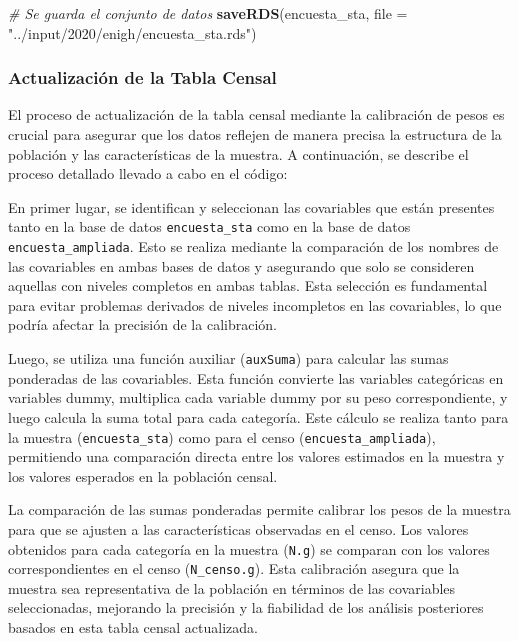 \documentclass[
  12pt,
]{book}
\newenvironment{Shaded}{\begin{snugshade}}{\end{snugshade}}
\newcommand{\AttributeTok}[1]{\textcolor[rgb]{0.13,0.29,0.53}{#1}}
\newcommand{\CommentTok}[1]{\textcolor[rgb]{0.56,0.35,0.01}{\textit{#1}}}
\newcommand{\FunctionTok}[1]{\textcolor[rgb]{0.13,0.29,0.53}{\textbf{#1}}}
\newcommand{\NormalTok}[1]{#1}
\newcommand{\StringTok}[1]{\textcolor[rgb]{0.31,0.60,0.02}{#1}}
\begin{document}
\begin{Shaded}
\begin{Highlighting}[]
\CommentTok{\# Se guarda el conjunto de datos}
\FunctionTok{saveRDS}\NormalTok{(encuesta\_sta, }\AttributeTok{file =} \StringTok{"../input/2020/enigh/encuesta\_sta.rds"}\NormalTok{)}
\end{Highlighting}
\end{Shaded}

\hypertarget{actualizaciuxf3n-de-la-tabla-censal}{%
\subsubsection*{Actualización de la Tabla Censal}\label{actualizaciuxf3n-de-la-tabla-censal}}

El proceso de actualización de la tabla censal mediante la calibración de pesos es crucial para asegurar que los datos reflejen de manera precisa la estructura de la población y las características de la muestra. A continuación, se describe el proceso detallado llevado a cabo en el código:

En primer lugar, se identifican y seleccionan las covariables que están presentes tanto en la base de datos \texttt{encuesta\_sta} como en la base de datos \texttt{encuesta\_ampliada}. Esto se realiza mediante la comparación de los nombres de las covariables en ambas bases de datos y asegurando que solo se consideren aquellas con niveles completos en ambas tablas. Esta selección es fundamental para evitar problemas derivados de niveles incompletos en las covariables, lo que podría afectar la precisión de la calibración.

Luego, se utiliza una función auxiliar (\texttt{auxSuma}) para calcular las sumas ponderadas de las covariables. Esta función convierte las variables categóricas en variables dummy, multiplica cada variable dummy por su peso correspondiente, y luego calcula la suma total para cada categoría. Este cálculo se realiza tanto para la muestra (\texttt{encuesta\_sta}) como para el censo (\texttt{encuesta\_ampliada}), permitiendo una comparación directa entre los valores estimados en la muestra y los valores esperados en la población censal.

La comparación de las sumas ponderadas permite calibrar los pesos de la muestra para que se ajusten a las características observadas en el censo. Los valores obtenidos para cada categoría en la muestra (\texttt{N.g}) se comparan con los valores correspondientes en el censo (\texttt{N\_censo.g}). Esta calibración asegura que la muestra sea representativa de la población en términos de las covariables seleccionadas, mejorando la precisión y la fiabilidad de los análisis posteriores basados en esta tabla censal actualizada.
\end{document}
